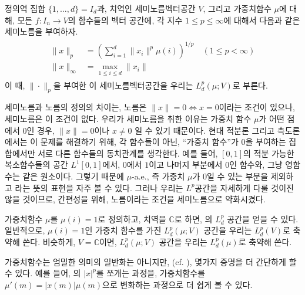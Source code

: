 \begin{definition}
\label{def:lpspace2}
    정의역 집합 $\{1, \dots, d\} = I_d$과, 치역인 세미노름벡터공간 $V$, 그리고 가중치함수 $\mu$에 대해, 모든 $f: I_n \to V$의 함수들의 벡터 공간에, 각 지수 $1 \leq p \leq \infty$에 대해서 다음과 같은 세미노름을 부여하자.
    \begin{align}
    \begin{split}
        \|x\|_p &= \left( \sum_{i = 1}^d \|x_i\|^p \mu(i) \right)^{1/p} \quad (1 \leq p < \infty) \\
        \|x\|_\infty &= \max_{1 \leq i \leq d} \|x_i\|
    \end{split}
    \end{align}
    이 때, $\|\cdot\|_p$을 부여한 이 세미노름벡터공간을 우리는 $L^p_d(\mu; V)$로 부른다.
\end{definition}

\begin{remark}
    세미노름과 노름의 정의의 차이는, 노름은 $\|x\| = 0 \iff x = 0$이라는 조건이 있으나, 세미노름은 이 조건이 없다.
    우리가 세미노름을 취한 이유는 가중치 함수 $\mu$가 어떤 점에서 $0$인 경우, $\|x\| = 0$이나 $x \neq 0$ 일 수 있기 때문이다.
    현대 적분론 그리고 측도론에서는 이 문제를 해결하기 위해, 각 함수들이 아닌, ``가중치 함수''가 $0$을 부여하는 집합에서만 서로 다른 함수들의 동치관계를 생각한다.
    예를 들어, $[0, 1]$의 적분 가능한 복소함수들의 공간 $L^1[0, 1]$에서, $0$에서 $1$이고 나머지 부분에서 $0$인 함수와, 그냥 영함수는 같은 원소이다.
    그렇기 때문에 $\mu$-a.e., 즉 가중치 $\mu$가 $0$일 수 있는 부분을 제외하고 라는 뜻의 표현을 자주 볼 수 있다.
    그러나 우리는 $L^p$공간을 자세하게 다룰 것이진 않을 것이므로, 간편성을 위해, 노름이라는 조건을 세미노름으로 약화시켰다.
\end{remark}

\begin{example}
    가중치함수 $\mu$를 $\mu(i) = 1$로 정의하고, 치역을 $\mathbb{C}$로 하면, 의 $L^p_d$ 공간을 얻을 수 있다.
    일반적으로, $\mu(i) = 1$인 가중치 함수를 가진 $L^p_d(\mu; V)$ 공간을 우리는 $L^p_d(V)$로 축약해 쓴다.
    비슷하게, $V = \mathbb{C}$이면, $L^p_d(\mu; V)$ 공간을 우리는 $L^p_d(\mu)$로 축약해 쓴다.
\end{example}

\begin{remark}
    가중치함수는 엄밀한 의미의 일반화는 아니지만, (cf. ), 몇가지 증명을 더 간단하게 할 수 있다.
    예를 들어, 의 $|x|^p$를 쪼개는 과정을, 가중치함수를 $\mu'(m) = |x(m)|\mu(m)$으로 변화하는 과정으로 더 쉽게 볼 수 있다.
\end{remark}

